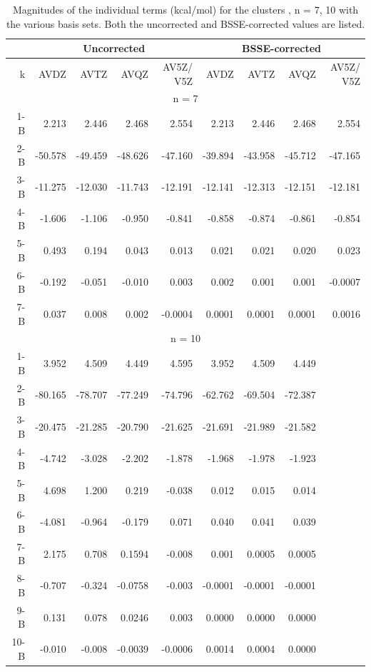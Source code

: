 \documentclass[11pt, proquest]{uwthesis}[2020/02/24]
\let\ce\ch
\begin{document}
\begin{table}[]
\centering
\begin{tabular}{@{}rrrrrrrrr@{}}
\toprule
     & \multicolumn{4}{c}{Uncorrected}         & \multicolumn{4}{c}{BSSE-corrected}      \\ \midrule
k    & AVDZ    & AVTZ    & AVQZ    & AV5Z/ V5Z & AVDZ    & AVTZ    & AVQZ    & AV5Z/ V5Z \\
\hline
\multicolumn{9}{c}{n = 7}                                                                \\
\hline
1-B  & 2.213   & 2.446   & 2.468   & 2.554     & 2.213   & 2.446   & 2.468   & 2.554     \\
2-B  & -50.578 & -49.459 & -48.626 & -47.160   & -39.894 & -43.958 & -45.712 & -47.165   \\
3-B  & -11.275 & -12.030 & -11.743 & -12.191   & -12.141 & -12.313 & -12.151 & -12.181   \\
4-B  & -1.606  & -1.106  & -0.950  & -0.841    & -0.858  & -0.874  & -0.861  & -0.854    \\
5-B  & 0.493   & 0.194   & 0.043   & 0.013     & 0.021   & 0.021   & 0.020   & 0.023     \\
6-B  & -0.192  & -0.051  & -0.010  & 0.003     & 0.002   & 0.001   & 0.001   & -0.0007   \\
7-B  & 0.037   & 0.008   & 0.002   & -0.0004   & 0.0001  & 0.0001  & 0.0001  & 0.0016    \\
\hline
\multicolumn{9}{c}{n = 10}                                                               \\
\hline
1-B  & 3.952   & 4.509   & 4.449   & 4.595     & 3.952   & 4.509   & 4.449   &           \\
2-B  & -80.165 & -78.707 & -77.249 & -74.796   & -62.762 & -69.504 & -72.387 &           \\
3-B  & -20.475 & -21.285 & -20.790 & -21.625   & -21.691 & -21.989 & -21.582 &           \\
4-B  & -4.742  & -3.028  & -2.202  & -1.878    & -1.968  & -1.978  & -1.923  &           \\
5-B  & 4.698   & 1.200   & 0.219   & -0.038    & 0.012   & 0.015   & 0.014   &           \\
6-B  & -4.081  & -0.964  & -0.179  & 0.071     & 0.040   & 0.041   & 0.039   &           \\
7-B  & 2.175   & 0.708   & 0.1594  & -0.008    & 0.001   & 0.0005  & 0.0005  &           \\
8-B  & -0.707  & -0.324  & -0.0758 & -0.003    & -0.0001 & -0.0001 & -0.0001 &           \\
9-B  & 0.131   & 0.078   & 0.0246  & 0.003     & 0.0000  & 0.0000  & 0.0000  &           \\
10-B & -0.010  & -0.008  & -0.0039 & -0.0006   & 0.0014  & 0.0004  & 0.0000  &           \\ \bottomrule
\end{tabular}
\caption{Magnitudes of the individual terms (kcal/mol) for the clusters \ce{(H2O)n}, n = 7, 10 with the various basis sets. Both the uncorrected and BSSE-corrected values are listed.}
\label{tab:MBE_I_T1}
\end{table}
\end{document}
